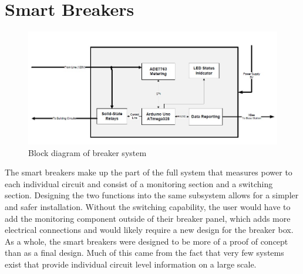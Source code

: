\section{Smart Breakers}

\begin{figure}[htbp]
\begin{center}
\includegraphics[width=6in]{includes/NJSmartBreaker}
\caption{Block diagram of breaker system}
\label{fig:smart_breaker}
\end{center}
\end{figure}

The smart breakers make up the part of the full system that measures power to each individual circuit and consist of a monitoring section and a switching section. Designing the two functions into the same subsystem allows for a simpler and safer installation. Without the switching capability, the user would have to add the monitoring component outside of their breaker panel, which adds more electrical connections and would likely require a new design for the breaker box. As a whole, the smart breakers were designed to be more of a proof of concept than as a final design. Much of this came from the fact that very few systems exist that provide individual circuit level information on a large scale. 

%




